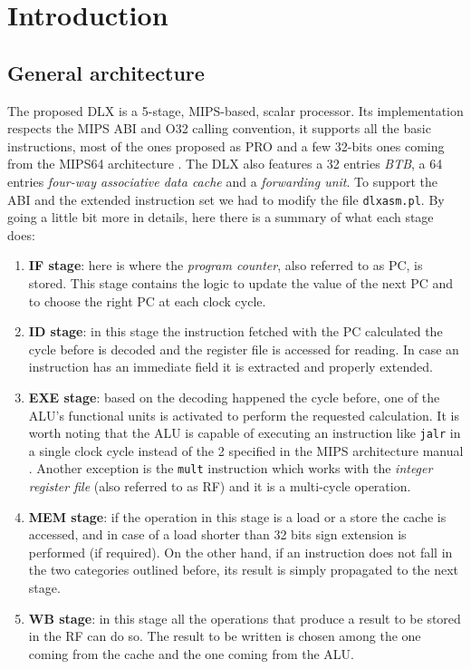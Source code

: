 \chapter{Introduction}
\label{chap:intro}

\section{General architecture}

The proposed DLX is a 5-stage, MIPS-based, scalar processor. Its implementation respects the MIPS ABI and O32 calling convention,
it supports all the basic instructions, most of the ones proposed as PRO and a few 32-bits ones coming from the MIPS64
architecture \cite{MIPS64_arch}. The DLX also features a 32 entries {\it BTB}, a 64 entries {\it four-way associative data cache} and a
{\it forwarding unit}. To support the ABI and the extended instruction set we had to modify the file \verb|dlxasm.pl|.
By going a little bit more in details, here there is a summary of what each stage does:

\begin{enumerate}
    \item \textbf{IF stage}: here is where the {\it program counter}, also referred to as PC, is stored. This stage contains the logic
    to update the value of the next PC and to choose the right PC at each clock cycle.
    
    \item \textbf{ID stage}: in this stage the instruction fetched with the PC calculated the cycle before is decoded and the register file is
    accessed for reading. In case an instruction has an immediate field it is extracted and properly extended.

    \item \textbf{EXE stage}: based on the decoding happened the cycle before, one of the ALU's functional units is activated to perform
    the requested calculation. It is worth noting that the ALU is capable of executing an instruction like \verb|jalr| in a single clock cycle
    instead of the 2 specified in the MIPS architecture manual \cite{MIPS64_arch}. Another exception is the \verb|mult| instruction which works
    with the {\it integer register file} (also referred to as RF) and it is a multi-cycle operation.

    \item \textbf{MEM stage}: if the operation in this stage is a load or a store the cache is accessed, and in case of a load shorter than
    32 bits sign extension is performed (if required). On the other hand, if an instruction does not fall in the two categories outlined before,
    its result is simply propagated to the next stage.

    \item \textbf{WB stage}: in this stage all the operations that produce a result to be stored in the RF can do so. The result to be written is
    chosen among the one coming from the cache and the one coming from the ALU.
\end{enumerate}

